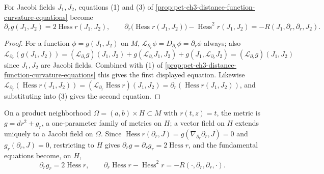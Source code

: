 \begin{proposition}
  \label{prop:pet-ch3-jacobi-field-curvature-equations}
  \leanok
  For Jacobi fields $J_1,J_2$, equations (1) and (3) of
  \cref{prop:pet-ch3-distance-function-curvature-equations} become
  \[
    \partial_rg(J_1,J_2)=2\operatorname{Hess}r(J_1,J_2),\qquad
    \partial_r\big(\operatorname{Hess}r(J_1,J_2)\big)-\operatorname{Hess}^2r(J_1,J_2)=-R(J_1,\partial_r,\partial_r,J_2).
  \]
\end{proposition}
\begin{proof}
  \leanok
  For a function $\phi=g(J_1,J_2)$ on $M$, $\mathcal
  L_{\partial_r}\phi=D_{\partial_r}\phi=\partial_r\phi$ always; also
  $\mathcal L_{\partial_r}(g(J_1,J_2))=(\mathcal L_{\partial_r}g)(J_1,J_2)+g(\mathcal
  L_{\partial_r}J_1,J_2)+g(J_1,\mathcal L_{\partial_r}J_2)=(\mathcal
  L_{\partial_r}g)(J_1,J_2)$ since $J_1,J_2$ are Jacobi fields. Combined with (1)
  of \cref{prop:pet-ch3-distance-function-curvature-equations} this gives the
  first displayed equation. Likewise
  $\mathcal L_{\partial_r}(\operatorname{Hess}r(J_1,J_2))=(\mathcal
  L_{\partial_r}\operatorname{Hess}r)(J_1,J_2)=\partial_r(\operatorname{Hess}r(J_1,J_2))$,
  and substituting into (3) gives the second equation.
\end{proof}

\begin{remark}
  \label{rem:pet-ch3-jacobi-field-product-neighborhood}
  \leanok
  On a product neighborhood $\Omega=(a,b)\times H\subset M$ with $r(t,z)=t$, the
  metric is $g=dr^2+g_r$, a one-parameter family of metrics on $H$; a vector
  field on $H$ extends uniquely to a Jacobi field on $\Omega$. Since
  $\operatorname{Hess}r(\partial_r,J)=g(\nabla_{\partial_r}\partial_r,J)=0$ and
  $g_r(\partial_r,J)=0$, restricting to $H$ gives $\partial_rg=\partial_rg_r=2\operatorname{Hess}r$,
  and the fundamental equations become, on $H$,
  \[
    \partial_rg_r=2\operatorname{Hess}r,\qquad
    \partial_r\operatorname{Hess}r-\operatorname{Hess}^2r=-R(\cdot,\partial_r,\partial_r,\cdot).
  \]
\end{remark}

